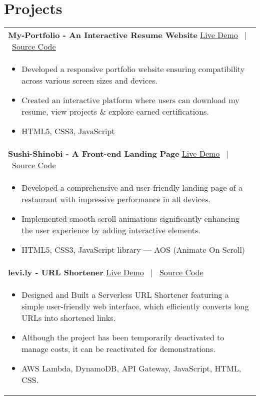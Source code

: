 \documentclass[a4paper,10pt]{article}
\begin{document}
\section{Projects}
\begin{tabularx}{\linewidth}{ @{} X  @{} }
    \textbf{My-Portfolio - An Interactive Resume Website} \hfill \href{https://omteja04.github.io/}{\underline{Live Demo}}  \ $|$ \ \href{https://github.com/omteja04/omteja04.github.io}{\underline{Source Code}}  \\[-0.3em]
    \begin{itemize}
        \item \textcolor{bullets}{Developed a responsive portfolio website ensuring compatibility across various screen sizes and devices.}
        \item \textcolor{bullets}{Created an interactive platform where users can download my resume, view projects \& explore earned certifications.}
        \item {HTML5, CSS3, JavaScript}
    \end{itemize} \\
    
    \textbf{Sushi-Shinobi - A Front-end Landing Page} \hfill \href{https://sushi-shinobi.vercel.app/}{\underline{Live Demo}}  \ $|$ \ \href{https://github.com/omteja04/sushi-shinobi}{\underline{Source Code}}  \\[-0.3em]
    \begin{itemize}
        \item \textcolor{bullets}{Developed a comprehensive and user-friendly landing page of a restaurant with impressive performance in all devices.}
        \item \textcolor{bullets}{Implemented smooth scroll animations significantly enhancing the user experience by adding interactive elements.}
        \item {HTML5, CSS3, JavaScript library --- AOS (Animate On Scroll)}
    \end{itemize} \\
    \textbf{levi.ly - URL Shortener} \hfill \href{https://omteja04.github.io/levi}{\underline{Live Demo}}  \ $|$ \ \href{https://github.com/omteja04/levi}{\underline{Source Code}}  \\[-0.3em]
    \begin{itemize}
        \item \textcolor{bullets}{Designed and Built a Serverless URL Shortener featuring a simple user-friendly web interface, which efficiently converts long URLs into shortened links.}
        \item \textcolor{bullets}{Although the project has been temporarily deactivated to manage costs, it can be reactivated for demonstrations.}
        \item AWS Lambda, DynamoDB, API Gateway, JavaScript, HTML, CSS.
    \end{itemize} \\
    

\end{tabularx}
\end{document}
